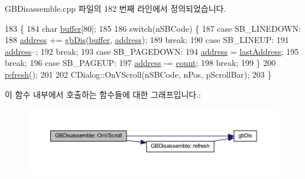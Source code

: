 G\+B\+Disassemble.\+cpp 파일의 182 번째 라인에서 정의되었습니다.


\begin{DoxyCode}
183 \{
184   \textcolor{keywordtype}{char} \mbox{\hyperlink{_g_b_a_8cpp_a28d4d3d8445e73a696b2d6f7eadabd96}{buffer}}[80];
185   
186   \textcolor{keywordflow}{switch}(nSBCode) \{
187   \textcolor{keywordflow}{case} SB\_LINEDOWN:
188     \mbox{\hyperlink{class_g_b_disassemble_afcfc78edb6d25dc9ef3f0ae25ac6731f}{address}} += \mbox{\hyperlink{_g_b_disassemble_8cpp_a4a1ab39ca4eef9345a5301970e27a8de}{gbDis}}(\mbox{\hyperlink{_g_b_a_8cpp_a28d4d3d8445e73a696b2d6f7eadabd96}{buffer}}, \mbox{\hyperlink{class_g_b_disassemble_afcfc78edb6d25dc9ef3f0ae25ac6731f}{address}});
189     \textcolor{keywordflow}{break};
190   \textcolor{keywordflow}{case} SB\_LINEUP:
191     \mbox{\hyperlink{class_g_b_disassemble_afcfc78edb6d25dc9ef3f0ae25ac6731f}{address}}--;
192     \textcolor{keywordflow}{break};
193   \textcolor{keywordflow}{case} SB\_PAGEDOWN:
194     \mbox{\hyperlink{class_g_b_disassemble_afcfc78edb6d25dc9ef3f0ae25ac6731f}{address}} = \mbox{\hyperlink{class_g_b_disassemble_ac1e3b7cd4e945eff2d9d89f14c4cbca9}{lastAddress}};
195     \textcolor{keywordflow}{break};
196   \textcolor{keywordflow}{case} SB\_PAGEUP:
197     \mbox{\hyperlink{class_g_b_disassemble_afcfc78edb6d25dc9ef3f0ae25ac6731f}{address}} -= \mbox{\hyperlink{class_g_b_disassemble_a656a8c8553caae166131f58e924129f5}{count}};
198     \textcolor{keywordflow}{break};
199   \}
200   \mbox{\hyperlink{class_g_b_disassemble_a0ae217c08ead8a3cf62c59dadaa27fde}{refresh}}();
201   
202   CDialog::OnVScroll(nSBCode, nPos, pScrollBar);
203 \}
\end{DoxyCode}
이 함수 내부에서 호출하는 함수들에 대한 그래프입니다.\+:
\nopagebreak
\begin{figure}[H]
\begin{center}
\leavevmode
\includegraphics[width=350pt]{class_g_b_disassemble_a80098655a0c93eeecc024a57ac0519ee_cgraph}
\end{center}
\end{figure}
\mbox{\label{class_g_b_disassemble_a0302b8ddf70b5c788766fbed0e0c852e}} 
